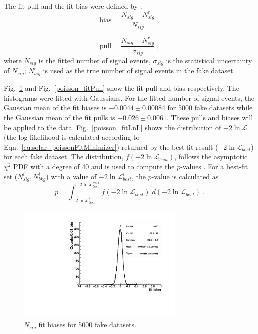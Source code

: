 The fit pull and the fit bias were defined by \cite{leta}:
\begin{equation}
\mathrm{bias}=\frac{N_{sig}-N^r_{sig}}{N_{sig}}\; ,
\end{equation}

\begin{equation}
\mathrm{pull}=\frac{N_{sig}-N^r_{sig}}{\sigma_{sig}}\; ,
\end{equation}
where $N_{sig}$ is the fitted number of signal events, $\sigma_{sig}$ is the statistical uncertainty of $N_{sig}$; $N^{r}_{sig}$ is used as the true number of signal events in the fake dataset.

Fig.~\ref{poisson_fitBias} and Fig.~\ref{poisson_fitPull} show the fit pull and bias respectively. The histograms were fitted with Gaussians. For the fitted number of signal events, the Gaussian mean of the fit biases is $-0.0044\pm0.00084$ for 5000 fake datasets while the Gaussian mean of the fit pulls is $-0.026\pm0.0061$. These pulls and biases will be applied to the data. Fig.~\ref{poisson_fitLnL} shows the distribution of $-2\ln \mathcal{L}$ (the log likelihood is calculated according to Eqn.~\ref{eq:solar_poissonFitMinimizer}) returned by the best fit result ($-2\ln \mathcal{L}_{best}$) for each fake dataset. The distribution, $f({-2\ln \mathcal{L}_{best}})$, follows the asymptotic $\chi^2$ PDF with a degree of 40 and is used to compute the $p$-values \cite{pdg2020}. For a best-fit set ($N^i_{sig},N^i_{bkg}$) with a value of $-2\ln \mathcal{L}^i_{best}$, the $p$-value is calculated as
\begin{equation*}
p=\int_{-2\ln \mathcal{L}^{i}_{best}}^{-2\ln \mathcal{L}^{max}_{best}}f({-2\ln \mathcal{L}_{best}}) \; d(-2\ln \mathcal{L}_{best}) \; .
\end{equation*}


\begin{figure}[!htb]
	\centering
	\includegraphics[width=8cm]{ensemble_fitBias.pdf}
	\caption{$N_{sig}$ fit biases for 5000 fake datasets. \label{poisson_fitBias}}
\end{figure} 

